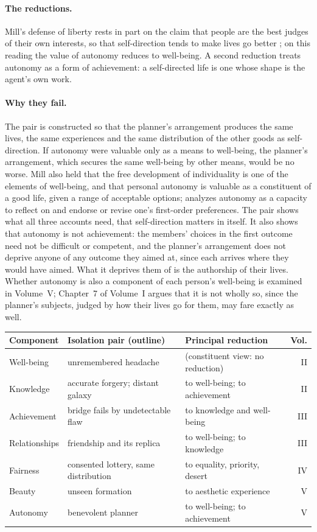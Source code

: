 \documentclass{situationist-preprint}
\begin{document}
\paragraph{The reductions.} Mill's defense of liberty rests in part on the claim that people are the best judges of their own interests, so that self-direction tends to make lives go better \citep[ch.~III]{Mill1859}; on this reading the value of autonomy reduces to well-being. A second reduction treats autonomy as a form of achievement: a self-directed life is one whose shape is the agent's own work.

\paragraph{Why they fail.} The pair is constructed so that the planner's arrangement produces the same lives, the same experiences and the same distribution of the other goods as self-direction. If autonomy were valuable only as a means to well-being, the planner's arrangement, which secures the same well-being by other means, would be no worse. Mill also held that the free development of individuality is one of the elements of well-being, and \citet{Raz1986} that personal autonomy is valuable as a constituent of a good life, given a range of acceptable options; \citet{Dworkin1988} analyzes autonomy as a capacity to reflect on and endorse or revise one's first-order preferences. The pair shows what all three accounts need, that self-direction matters in itself. It also shows that autonomy is not achievement: the members' choices in the first outcome need not be difficult or competent, and the planner's arrangement does not deprive anyone of any outcome they aimed at, since each arrives where they would have aimed. What it deprives them of is the authorship of their lives. Whether autonomy is also a component of each person's well-being is examined in Volume~V; Chapter~7 of Volume~I argues that it is not wholly so, since the planner's subjects, judged by how their lives go for them, may fare exactly as well.

\begin{center}\small
\begin{tabular}{@{}p{2.2cm}p{4.6cm}p{4.4cm}r@{}}
\toprule
Component & Isolation pair (outline) & Principal reduction & Vol. \\
\midrule
Well-being & unremembered headache & (constituent view: no reduction) & II \\
Knowledge & accurate forgery; distant galaxy & to well-being; to achievement & II \\
Achievement & bridge fails by undetectable flaw & to knowledge and well-being & III \\
Relationships & friendship and its replica & to well-being; to knowledge & III \\
Fairness & consented lottery, same distribution & to equality, priority, desert & IV \\
Beauty & unseen formation & to aesthetic experience & V \\
Autonomy & benevolent planner & to well-being; to achievement & V \\
\bottomrule
\end{tabular}
\end{center}
\end{document}
